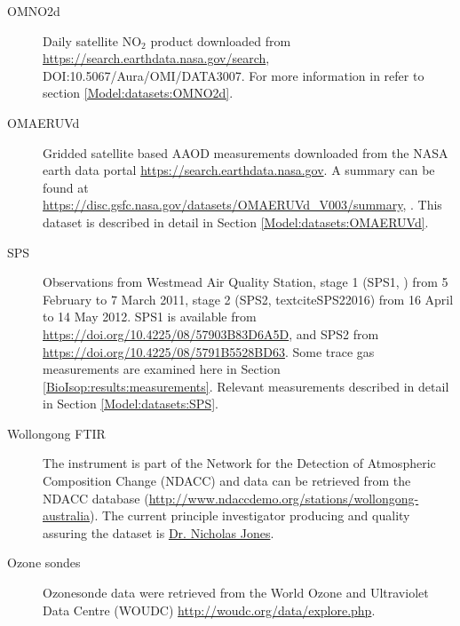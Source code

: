 \begin{description}
    \item[OMNO2d] Daily satellite NO$_2$ product downloaded from \url{https://search.earthdata.nasa.gov/search}, DOI:10.5067/Aura/OMI/DATA3007. 
    For more information in refer to section \ref{Model:datasets:OMNO2d}.
    
    \item[OMAERUVd] Gridded satellite based AAOD measurements downloaded from the NASA earth data portal \url{https://search.earthdata.nasa.gov}.
    A summary can be found at \url{https://disc.gsfc.nasa.gov/datasets/OMAERUVd\_V003/summary}, .
    This dataset is described in detail in Section \ref{Model:datasets:OMAERUVd}.
    
    
    \item[SPS] Observations from Westmead Air Quality Station, stage 1 (SPS1, \textcite{SPS12016}) from 5 February to 7 March 2011, stage 2 (SPS2, textcite{SPS22016})  from 16 April to 14 May 2012.
    SPS1 is available from \url{https://doi.org/10.4225/08/57903B83D6A5D}, and SPS2 from \url{https://doi.org/10.4225/08/5791B5528BD63}.
    Some trace gas measurements are examined here in Section \ref{BioIsop:results:measurements}.
    Relevant measurements described in detail in Section \ref{Model:datasets:SPS}.
    
    \item[Wollongong FTIR] The instrument is part of the Network for the Detection of Atmospheric Composition Change (NDACC) and data can be retrieved from the NDACC database (\url{http://www.ndaccdemo.org/stations/wollongong-australia}).
    The current principle investigator producing and quality assuring the dataset is \href{mailto:njones@uow.edu.au}{Dr. Nicholas Jones}.
    
    \item[Ozone sondes] Ozonesonde data were retrieved from the World Ozone and Ultraviolet Data Centre (WOUDC)  \url{http://woudc.org/data/explore.php}.
    
    
    
  \end{description}